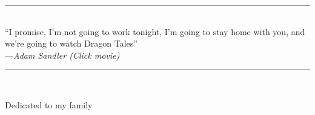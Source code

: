 


\begin{vplace}[0.1]


\begin{minipage}[t]{0.5\textwidth}
    \centering
    \par\noindent\rule{0.9\textwidth}{0.4pt} \\
    ``I promise, I'm not going to work tonight,
    I'm going to stay home with you, and \\ we're going to watch Dragon Tales'' \\
    ---\textit{Adam Sandler (Click movie)}
    \par\noindent\rule{0.9\textwidth}{0.4pt} \\
\end{minipage}
    

\vspace{18pt}

Dedicated to my family

\end{vplace}
